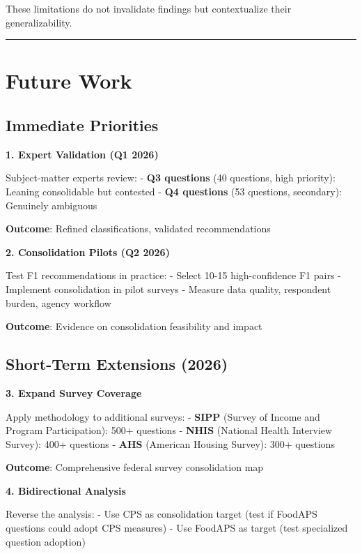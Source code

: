 \documentclass[
  letterpaper,
]{report}
\begin{document}
These limitations do not invalidate findings but contextualize their
generalizability.

\begin{center}\rule{0.5\linewidth}{0.5pt}\end{center}

\section{Future Work}\label{future-work}

\subsection{Immediate Priorities}\label{immediate-priorities}

\textbf{1. Expert Validation (Q1 2026)}

Subject-matter experts review: - \textbf{Q3 questions} (40 questions,
high priority): Leaning consolidable but contested - \textbf{Q4
questions} (53 questions, secondary): Genuinely ambiguous

\textbf{Outcome}: Refined classifications, validated recommendations

\textbf{2. Consolidation Pilots (Q2 2026)}

Test F1 recommendations in practice: - Select 10-15 high-confidence F1
pairs - Implement consolidation in pilot surveys - Measure data quality,
respondent burden, agency workflow

\textbf{Outcome}: Evidence on consolidation feasibility and impact

\subsection{Short-Term Extensions
(2026)}\label{short-term-extensions-2026}

\textbf{3. Expand Survey Coverage}

Apply methodology to additional surveys: - \textbf{SIPP} (Survey of
Income and Program Participation): 500+ questions - \textbf{NHIS}
(National Health Interview Survey): 400+ questions - \textbf{AHS}
(American Housing Survey): 300+ questions

\textbf{Outcome}: Comprehensive federal survey consolidation map

\textbf{4. Bidirectional Analysis}

Reverse the analysis: - Use CPS as consolidation target (test if FoodAPS
questions could adopt CPS measures) - Use FoodAPS as target (test
specialized question adoption)
\end{document}
